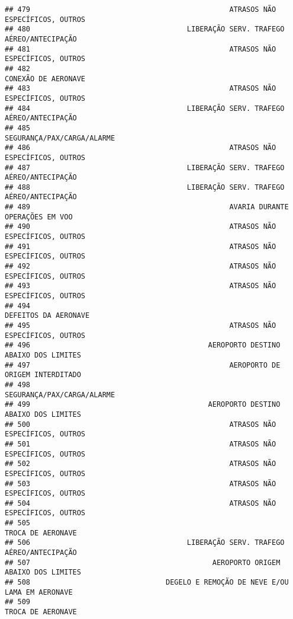 \documentclass[
]{article}
\begin{document}
\begin{verbatim}
## 479                                               ATRASOS NÃO ESPECÍFICOS, OUTROS
## 480                                     LIBERAÇÃO SERV. TRAFEGO AÉREO/ANTECIPAÇÃO
## 481                                               ATRASOS NÃO ESPECÍFICOS, OUTROS
## 482                                                           CONEXÃO DE AERONAVE
## 483                                               ATRASOS NÃO ESPECÍFICOS, OUTROS
## 484                                     LIBERAÇÃO SERV. TRAFEGO AÉREO/ANTECIPAÇÃO
## 485                                                    SEGURANÇA/PAX/CARGA/ALARME
## 486                                               ATRASOS NÃO ESPECÍFICOS, OUTROS
## 487                                     LIBERAÇÃO SERV. TRAFEGO AÉREO/ANTECIPAÇÃO
## 488                                     LIBERAÇÃO SERV. TRAFEGO AÉREO/ANTECIPAÇÃO
## 489                                               AVARIA DURANTE OPERAÇÕES EM VOO
## 490                                               ATRASOS NÃO ESPECÍFICOS, OUTROS
## 491                                               ATRASOS NÃO ESPECÍFICOS, OUTROS
## 492                                               ATRASOS NÃO ESPECÍFICOS, OUTROS
## 493                                               ATRASOS NÃO ESPECÍFICOS, OUTROS
## 494                                                          DEFEITOS DA AERONAVE
## 495                                               ATRASOS NÃO ESPECÍFICOS, OUTROS
## 496                                          AEROPORTO DESTINO ABAIXO DOS LIMITES
## 497                                               AEROPORTO DE ORIGEM INTERDITADO
## 498                                                    SEGURANÇA/PAX/CARGA/ALARME
## 499                                          AEROPORTO DESTINO ABAIXO DOS LIMITES
## 500                                               ATRASOS NÃO ESPECÍFICOS, OUTROS
## 501                                               ATRASOS NÃO ESPECÍFICOS, OUTROS
## 502                                               ATRASOS NÃO ESPECÍFICOS, OUTROS
## 503                                               ATRASOS NÃO ESPECÍFICOS, OUTROS
## 504                                               ATRASOS NÃO ESPECÍFICOS, OUTROS
## 505                                                             TROCA DE AERONAVE
## 506                                     LIBERAÇÃO SERV. TRAFEGO AÉREO/ANTECIPAÇÃO
## 507                                           AEROPORTO ORIGEM ABAIXO DOS LIMITES
## 508                                DEGELO E REMOÇÃO DE NEVE E/OU LAMA EM AERONAVE
## 509                                                             TROCA DE AERONAVE

\end{verbatim}
\end{document}
